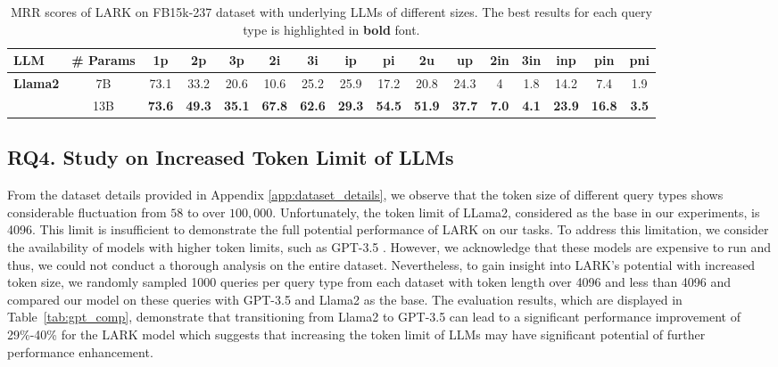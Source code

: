 \documentclass{article} %
\newcommand{\model}{LARK}
\begin{document}
\begin{table}[htbp]
\centering
\small
\vspace{-1em}
\setlength{\tabcolsep}{3pt}
\caption{MRR scores of {\model} on FB15k-237 dataset with underlying LLMs of different sizes. {The best results for each query type is highlighted in \textbf{bold} font.}}
\begin{tabular}{lc|ccccccccc|ccccc}
\hline
 \textbf{LLM}   & \textbf{\# Params}            & \textbf{1p}         & \textbf{2p}   & \textbf{3p}   & \textbf{2i}   & \textbf{3i}   & \textbf{ip}   & \textbf{pi}   & \textbf{2u}   & \textbf{up}   & \textbf{2in} & \textbf{3in} & \textbf{inp}  & \textbf{pin}  & \textbf{pni} \\\hline
\textbf{Llama2}   &   7B   & 73.1&33.2&20.6&10.6&25.2&25.9&17.2&20.8&24.3&4&1.8&14.2&7.4&1.9\\
   &  13B  & \textbf{73.6}&\textbf{49.3}&\textbf{35.1}&\textbf{67.8}&\textbf{62.6}&\textbf{29.3}&\textbf{54.5}&\textbf{51.9}&\textbf{37.7}&\textbf{7.0}&\textbf{4.1}&\textbf{23.9}&\textbf{16.8}&\textbf{3.5}\\
\hline
\end{tabular}
\vspace{-1em}
\label{tab:scale}
\end{table}

\subsection{RQ4. Study on Increased Token Limit of LLMs}
From the dataset details provided in Appendix \ref{app:dataset_details}, we observe that the token size of different query types shows considerable fluctuation from $58$ to over $100,000$. Unfortunately, the token limit of LLama2, considered as the base in our experiments, is 4096. This limit is insufficient to demonstrate the full potential performance of {\model} on our tasks. To address this limitation, we consider the availability of models with higher token limits, such as GPT-3.5 \citep{openai2023gpt}. However, we acknowledge that these models are expensive to run and thus, we could not conduct a thorough analysis on the entire dataset. Nevertheless, to gain insight into {\model}'s potential with increased token size, we randomly sampled 1000 queries per query type from each dataset with token length over 4096 and less than 4096 and compared our model on these queries with GPT-3.5 and Llama2 as the base. {The evaluation results, which are displayed in Table~\ref{tab:gpt_comp}, demonstrate that transitioning from Llama2 to GPT-3.5 can lead to a significant performance improvement of 29\%-40\% for the LARK model which suggests that increasing the token limit of LLMs may have significant potential of further performance enhancement.}
\end{document}
